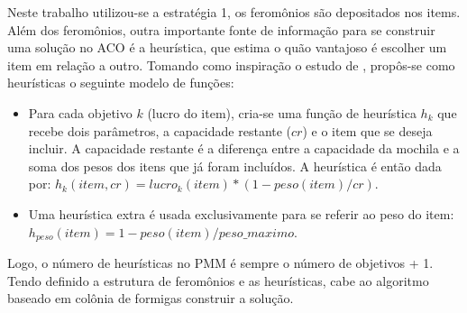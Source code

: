 Neste trabalho utilizou-se a estratégia 1, os feromônios são depositados nos items. Além dos feromônios, outra importante fonte de informação para se construir uma solução no ACO é a heurística, que estima o quão vantajoso é escolher um item em relação a outro. Tomando como inspiração o estudo de \cite{Ke2010}, propôs-se como heurísticas o seguinte modelo de funções:

\begin{itemize}
	\item Para cada objetivo $k$ (lucro do item), cria-se uma função de heurística $h_k$ que recebe dois parâmetros, a capacidade restante ($cr$) e o item que se deseja incluir. A capacidade restante é a diferença entre a capacidade da mochila e a soma dos pesos dos itens que já foram incluídos. A heurística é então dada por: $h_k(item, cr) = lucro_k(item) * (1 - peso(item) / cr)$.
	\item Uma heurística extra é usada exclusivamente para se referir ao peso do item: $h_{peso}(item) = 1 - peso(item) / peso\_maximo$.
\end{itemize}

Logo, o número de heurísticas no PMM é sempre o número de objetivos + 1. Tendo definido a estrutura de feromônios e as heurísticas, cabe ao algoritmo baseado em colônia de formigas construir a solução.